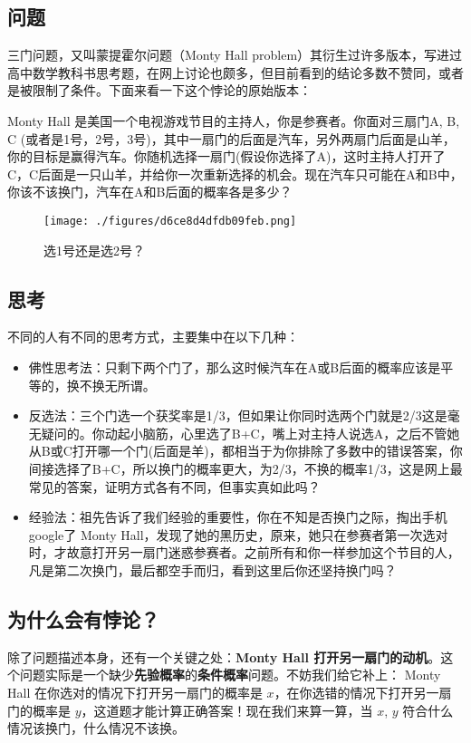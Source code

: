 
\subsection{问题}
三门问题，又叫蒙提霍尔问题（Monty Hall problem）其衍生过许多版本，写进过高中数学教科书思考题，在网上讨论也颇多，但目前看到的结论多数不赞同，或者是被限制了条件。下面来看一下这个悖论的原始版本：

Monty Hall 是美国一个电视游戏节目的主持人，你是参赛者。你面对三扇门A, B, C (或者是1号，2号，3号)，其中一扇门的后面是汽车，另外两扇门后面是山羊，你的目标是赢得汽车。你随机选择一扇门(假设你选择了A)，这时主持人打开了C，C后面是一只山羊，并给你一次重新选择的机会。现在汽车只可能在A和B中，你该不该换门，汽车在A和B后面的概率各是多少？

\begin{figure}[ht]
\centering
\texttt{[image: ./figures/d6ce8d4dfdb09feb.png]}
\caption{选1号还是选2号？} \label{fig_MontyH_0}
\end{figure}

\subsection{思考}
不同的人有不同的思考方式，主要集中在以下几种：

\begin{itemize}
\item 佛性思考法：只剩下两个门了，那么这时候汽车在A或B后面的概率应该是平等的，换不换无所谓。

\item 反选法：三个门选一个获奖率是1/3，但如果让你同时选两个门就是2/3这是毫无疑问的。你动起小脑筋，心里选了B+C，嘴上对主持人说选A，之后不管她从B或C打开哪一个门(后面是羊)，都相当于为你排除了多数中的错误答案，你间接选择了B+C，所以换门的概率更大，为2/3，不换的概率1/3，这是网上最常见的答案，证明方式各有不同，但事实真如此吗？

\item 经验法：祖先告诉了我们经验的重要性，你在不知是否换门之际，掏出手机google了 Monty Hall，发现了她的黑历史，原来，她只在参赛者第一次选对时，才故意打开另一扇门迷惑参赛者。之前所有和你一样参加这个节目的人，凡是第二次换门，最后都空手而归，看到这里后你还坚持换门吗？
\end{itemize}

\subsection{为什么会有悖论？}
除了问题描述本身，还有一个关键之处：\textbf{Monty Hall 打开另一扇门的动机}。这个问题实际是一个缺少\textbf{先验概率}的\textbf{条件概率}问题。不妨我们给它补上： Monty Hall 在你选对的情况下打开另一扇门的概率是 $x$，在你选错的情况下打开另一扇门的概率是 $y$，这道题才能计算正确答案！现在我们来算一算，当 $x$, $y$ 符合什么情况该换门，什么情况不该换。

